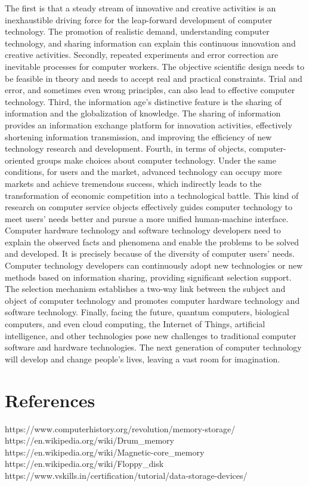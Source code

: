 \documentclass{article}
\begin{document}
The first is that a steady stream of innovative and creative activities is an inexhaustible driving force for the leap-forward development of computer technology. The promotion of realistic demand, understanding computer technology, and sharing information can explain this continuous innovation and creative activities. Secondly, repeated experiments and error correction are inevitable processes for computer workers. The objective scientific design needs to be feasible in theory and needs to accept real and practical constraints. Trial and error, and sometimes even wrong principles, can also lead to effective computer technology. Third, the information age's distinctive feature is the sharing of information and the globalization of knowledge. The sharing of information provides an information exchange platform for innovation activities, effectively shortening information transmission, and improving the efficiency of new technology research and development. Fourth, in terms of objects, computer-oriented groups make choices about computer technology. Under the same conditions, for users and the market, advanced technology can occupy more markets and achieve tremendous success, which indirectly leads to the transformation of economic competition into a technological battle. This kind of research on computer service objects effectively guides computer technology to meet users' needs better and pursue a more unified human-machine interface. Computer hardware technology and software technology developers need to explain the observed facts and phenomena and enable the problems to be solved and developed. It is precisely because of the diversity of computer users' needs. Computer technology developers can continuously adopt new technologies or new methods based on information sharing, providing significant selection support. The selection mechanism establishes a two-way link between the subject and object of computer technology and promotes computer hardware technology and software technology. Finally, facing the future, quantum computers, biological computers, and even cloud computing, the Internet of Things, artificial intelligence, and other technologies pose new challenges to traditional computer software and hardware technologies. The next generation of computer technology will develop and change people's lives, leaving a vast room for imagination.

\section{References}
https://www.computerhistory.org/revolution/memory-storage/\\
https://en.wikipedia.org/wiki/Drum\_memory\\
https://en.wikipedia.org/wiki/Magnetic-core\_memory\\
https://en.wikipedia.org/wiki/Floppy\_disk\\
https://www.vskills.in/certification/tutorial/data-storage-devices/\\
\end{document}
